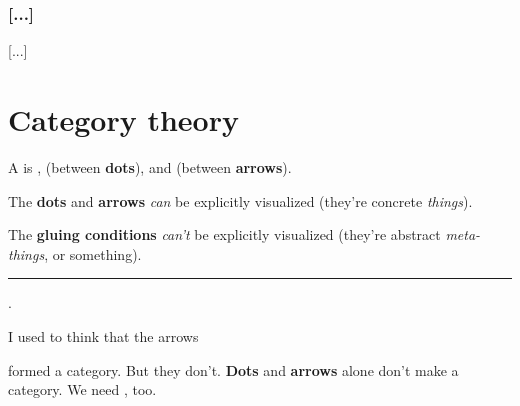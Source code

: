 \subsection{\bf [...]}

[...]




\chapter{Category theory}

\vs
A  is ,  (between {\bf dots}), and  (between {\bf arrows}). \par
The {\bf dots} and {\bf arrows} {\it can} be explicitly visualized (they're concrete {\it things}). \par
The {\bf gluing conditions} {\it can't} be explicitly visualized (they're abstract {\it meta-things}, or something). \par

\vs\hrule\vskip1pt
. \par
I used to think that the arrows \par
{}
formed a category. But they don't. {\bf Dots} and {\bf arrows} alone don't make a category. We need , too. \par

